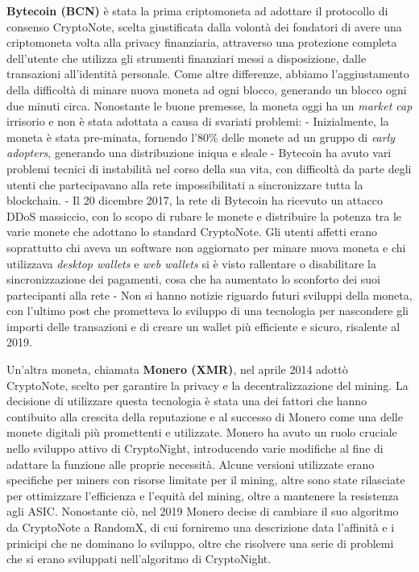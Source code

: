 \textbf{Bytecoin (BCN)} è stata la prima criptomoneta ad adottare il
protocollo di consenso CryptoNote, scelta giustificata dalla volontà dei
fondatori di avere una criptomoneta volta alla privacy finanziaria,
attraverso una protezione completa dell'utente che utilizza gli
strumenti finanziari messi a disposizione, dalle transazioni
all'identità personale. Come altre differenze, abbiamo l'aggiustamento
della difficoltà di minare nuova moneta ad ogni blocco, generando un
blocco ogni due minuti circa. Nonostante le buone premesse, la moneta
oggi ha un \emph{market cap} irrisorio e non è stata adottata a causa di
svariati problemi: - Inizialmente, la moneta è stata pre-minata,
fornendo l'80\% delle monete ad un gruppo di \emph{early adopters},
generando una distribuzione iniqua e sleale - Bytecoin ha avuto vari
problemi tecnici di instabilità nel corso della sua vita, con difficoltà
da parte degli utenti che partecipavano alla rete impossibilitati a
sincronizzare tutta la blockchain. - Il 20 dicembre 2017, la rete di
Bytecoin ha ricevuto un attacco DDoS massiccio, con lo scopo di rubare
le monete e distribuire la potenza tra le varie monete che adottano lo
standard CryptoNote. Gli utenti affetti erano soprattutto chi aveva un
software non aggiornato per minare nuova moneta e chi utilizzava
\emph{desktop wallets} e \emph{web wallets} si è visto rallentare o
disabilitare la sincronizzazione dei pagamenti, cosa che ha aumentato lo
sconforto dei suoi partecipanti alla rete - Non si hanno notizie
riguardo futuri sviluppi della moneta, con l'ultimo post che prometteva
lo sviluppo di una tecnologia per nascondere gli importi delle
transazioni e di creare un wallet più efficiente e sicuro, risalente al
2019.

\hfill\break
Un'altra moneta, chiamata \textbf{Monero (XMR)}, nel aprile 2014 adottò
CryptoNote, scelto per garantire la privacy e la decentralizzazione del
mining. La decisione di utilizzare questa tecnologia è stata una dei
fattori che hanno contibuito alla crescita della reputazione e al
successo di Monero come una delle monete digitali più promettenti e
utilizzate. Monero ha avuto un ruolo cruciale nello sviluppo attivo di
CryptoNight, introducendo varie modifiche al fine di adattare la
funzione alle proprie necessità. Alcune versioni utilizzate erano
specifiche per miners con risorse limitate per il mining, altre sono
state rilasciate per ottimizzare l'efficienza e l'equità del mining,
oltre a mantenere la resistenza agli ASIC. Nonostante ciò, nel 2019
Monero decise di cambiare il suo algoritmo da CryptoNote a RandomX, di
cui forniremo una descrizione data l'affinità e i prinicipi che ne
dominano lo sviluppo, oltre che risolvere una serie di problemi che si
erano sviluppati nell'algoritmo di CryptoNight.

